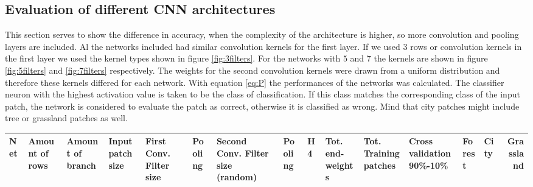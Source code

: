 \documentclass[a4paper,onecolumn]{report}
\begin{document}
\begin{appendices}
	
\chapter{Evaluation of different CNN architectures}
\label{app:DiffentArchitectures}
This section serves to show the difference in accuracy,  when the complexity of the architecture is higher, so more convolution and pooling layers are included. Al the networks included had similar convolution kernels for the first layer. If we used $3$ rows or convolution kernels in the first layer we used the kernel types shown in figure \ref{fig:3filters}. For the networks with $5$ and $7$ the kernels are shown in figure \ref{fig:5filters} and \ref{fig:7filters} respectively. The weights for the second convolution kernels were drawn from a uniform distribution and therefore these kernels differed for each network. With equation \ref{eq:P} the performances of the networks was calculated. The classifier neuron with the highest activation value is taken to be the class of classification. If this class matches the corresponding class of the input patch, the network is considered to evaluate the patch as correct, otherwise it is classified as wrong. Mind that city patches might include tree or grassland patches as well.

\begin{tiny}
	\begin{center}
		\begin{tabular}{| l |p{0.5cm} |p{0.5cm} |p{0.5cm} |p{0.75cm} |p{0.7cm} |p{0.7cm} |p{0.75cm} |p{0.75cm} |p{0.75cm} |p{0.5cm} |p{0.8cm} |p{0.8cm} |p{0.8cm} |r | }
			\hline
			Net	& Amount of rows	& Amount of branch	& Input patch size	& First Conv. Filter size	& Pooling	& Second Conv. Filter size (random)&	Pooling	&H4	& Tot. end-weights	&Tot. Training patches	& Cross validation 90\%-10\% & Forest &	City	& Grassland \\ \hline
			

\end{tabular}
\end{center}
\end{tiny}
\end{appendices}
\end{document}
